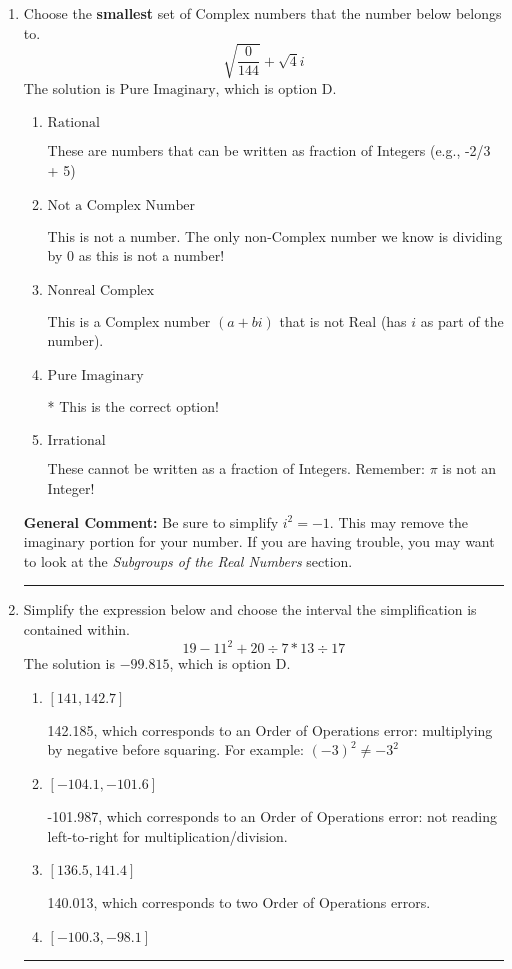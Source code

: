 \documentclass{extbook}[14pt]
\newcommand{\litem}[1]{\item #1

\rule{\textwidth}{0.4pt}}
\begin{document}
\begin{enumerate}\litem{
Choose the \textbf{smallest} set of Complex numbers that the number below belongs to.
\[ \sqrt{\frac{0}{144}}+\sqrt{4}i \]The solution is \( \text{Pure Imaginary} \), which is option D.\begin{enumerate}[label=\Alph*.]
\item \( \text{Rational} \)

These are numbers that can be written as fraction of Integers (e.g., -2/3 + 5)
\item \( \text{Not a Complex Number} \)

This is not a number. The only non-Complex number we know is dividing by 0 as this is not a number!
\item \( \text{Nonreal Complex} \)

This is a Complex number $(a+bi)$ that is not Real (has $i$ as part of the number).
\item \( \text{Pure Imaginary} \)

* This is the correct option!
\item \( \text{Irrational} \)

These cannot be written as a fraction of Integers. Remember: $\pi$ is not an Integer!
\end{enumerate}

\textbf{General Comment:} Be sure to simplify $i^2 = -1$. This may remove the imaginary portion for your number. If you are having trouble, you may want to look at the \textit{Subgroups of the Real Numbers} section.
}
\litem{
Simplify the expression below and choose the interval the simplification is contained within.
\[ 19 - 11^2 + 20 \div 7 * 13 \div 17 \]The solution is \( -99.815 \), which is option D.\begin{enumerate}[label=\Alph*.]
\item \( [141, 142.7] \)

 142.185, which corresponds to an Order of Operations error: multiplying by negative before squaring. For example: $(-3)^2 \neq -3^2$
\item \( [-104.1, -101.6] \)

 -101.987, which corresponds to an Order of Operations error: not reading left-to-right for multiplication/division.
\item \( [136.5, 141.4] \)

 140.013, which corresponds to two Order of Operations errors.
\item \( [-100.3, -98.1] \)


\end{enumerate}}
\end{enumerate}
\end{document}
